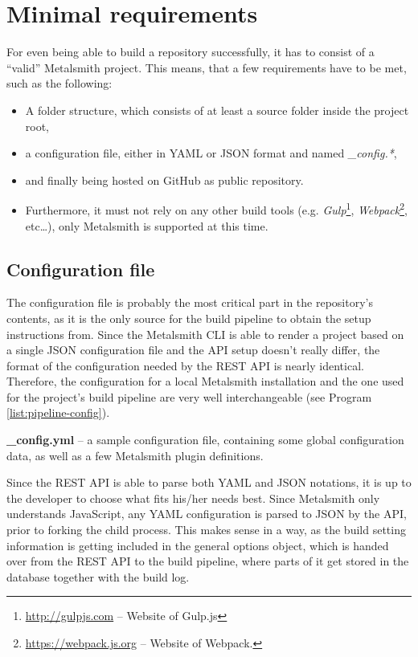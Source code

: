 \section{Minimal requirements}
\label{sec:minimalrequirements}

For even being able to build a repository successfully, it has to consist of a ``valid'' Metalsmith project. This means, that a few requirements have to be met, such as the following:

\begin{itemize}
  \item A folder structure, which consists of at least a source folder inside the project root,
  \item a configuration file, either in YAML or JSON format and named \emph{\_config.*},
  \item and finally being hosted on GitHub as public repository.
  \item Furthermore, it must not rely on any other build tools (e.g. \emph{Gulp}\footnote{\url{http://gulpjs.com} -- Website of Gulp.js}, \emph{Webpack}\footnote{\url{https://webpack.js.org} -- Website of Webpack.}, etc\ldots), only Metalsmith is supported at this time.
\end{itemize}

\subsection{Configuration file}
\label{sec:minimalrequirements-configuration}
The configuration file is probably the most critical part in the repository's contents, as it is the only source for the build pipeline to obtain the setup instructions from. Since the Metalsmith CLI is able to render a project based on a single JSON configuration file and the API setup doesn't really differ, the format of the configuration needed by the REST API is nearly identical. Therefore, the configuration for a local Metalsmith installation and the one used for the project's build pipeline are very well interchangeable (see Program \ref{list:pipeline-config}).

\begin{program}
  \caption{\textbf{\_config.yml} -- a sample configuration file, containing some global configuration data, as well as a few Metalsmith plugin definitions.}
  \label{list:pipeline-config}

\end{program}

Since the REST API is able to parse both YAML and JSON notations, it is up to the developer to choose what fits his/her needs best. Since Metalsmith only understands JavaScript, any YAML configuration is parsed to JSON by the API, prior to forking the child process. This makes sense in a way, as the build setting information is getting included in the general options object, which is handed over from the REST API to the build pipeline, where parts of it get stored in the database together with the build log.


